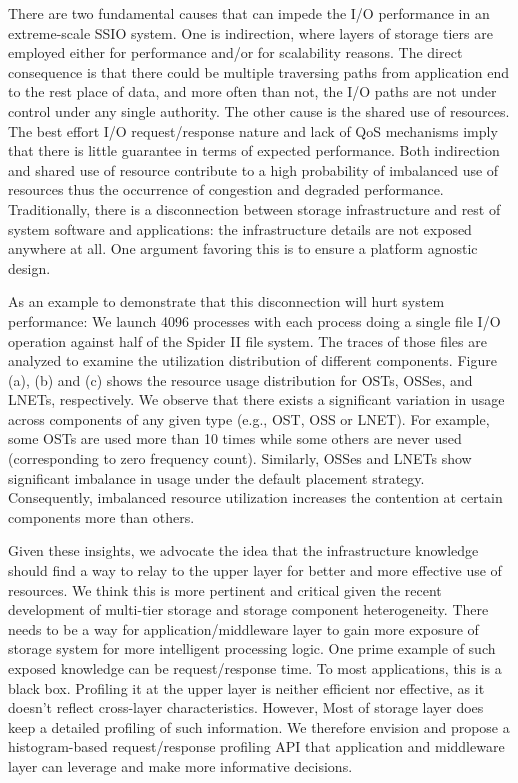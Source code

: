 There are two fundamental causes that can impede the I/O performance
in an extreme-scale SSIO system. One is indirection, where layers
of storage tiers are employed either for performance and/or for
scalability reasons.  The direct consequence is that there could
be multiple traversing paths from application end to the rest place
of data, and more often than not, the I/O paths are not under control
under any single authority. The other cause is the shared use of
resources. The best effort I/O request/response nature and lack of
QoS mechanisms imply that there is little guarantee in terms of
expected performance.  Both indirection and shared use of resource
contribute to a high probability of imbalanced use of resources
thus the occurrence of congestion and degraded performance.
Traditionally, there is a disconnection between storage infrastructure
and rest of system software and applications: the infrastructure
details are not exposed anywhere at all. One argument favoring this
is to ensure a platform agnostic design.

As an example to demonstrate that this disconnection will hurt
system performance: We launch 4096 processes with each process doing
a single file I/O operation against half of the Spider II file
system. The traces of those files are analyzed to examine the
utilization distribution of different components. Figure (a), (b)
and (c) shows the resource usage distribution for OSTs, OSSes, and
LNETs, respectively. We observe that there exists a significant
variation in usage across components of any given type (e.g., OST,
OSS or LNET). For example, some OSTs are used more than 10 times
while some others are never used (corresponding to zero frequency
count). Similarly, OSSes and LNETs show significant imbalance in
usage under the default placement strategy. Consequently, imbalanced
resource utilization increases the contention at certain components
more than others.

Given these insights, we advocate the idea that the infrastructure
knowledge should find a way to relay to the upper layer for better
and more effective use of resources. We think this is more pertinent
and critical given the recent development of multi-tier storage and
storage component heterogeneity.  There needs to be a way for
application/middleware layer to gain more exposure of storage system
for more intelligent processing logic.  One prime example of such
exposed knowledge can be request/response time. To most applications,
this is a black box. Profiling it at the upper layer is neither
efficient nor effective, as it doesn't reflect cross-layer
characteristics. However, Most of storage layer does keep a detailed
profiling of such information. We therefore envision and propose a
histogram-based request/response profiling API that application and
middleware layer can leverage and make more informative decisions.



